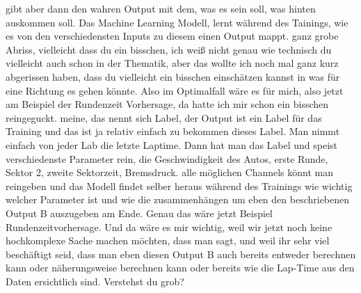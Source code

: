 gibt aber dann  den wahren Output mit dem, was es sein soll, was hinten auskommen soll. Das Machine Learning Modell, lernt während des Tainings,  wie es von den verschiedensten Inputs zu diesem  einen  Output mappt. ganz grobe Abriss, vielleicht dass du ein bisschen, ich weiß nicht genau wie technisch du vielleicht  auch schon in der Thematik, aber das wollte ich noch mal ganz kurz abgerissen haben, dass du vielleicht ein bisschen einschätzen kannst in was für eine Richtung  es gehen könnte. Also im Optimalfall wäre es für mich, also jetzt am Beispiel der Rundenzeit Vorhersage, da hatte ich mir schon ein bisschen reingeguckt. meine, das nennt sich Label, der Output ist ein Label für das Training und das ist ja relativ einfach zu bekommen dieses Label. Man nimmt einfach von jeder Lab die letzte Laptime. Dann hat man das Label und speist verschiedenste Parameter rein, die Geschwindigkeit des Autos, erste Runde, Sektor 2, zweite Sektorzeit, Bremsdruck. alle möglichen Channels könnt man reingeben und das Modell findet selber heraus während des Trainings wie wichtig welcher Parameter ist und wie die zusammenhängen um eben den beschriebenen Output B auszugeben am Ende. Genau das wäre jetzt Beispiel Rundenzeitvorhersage. Und da wäre es mir wichtig, weil wir jetzt noch keine hochkomplexe Sache machen möchten, dass man sagt, und weil ihr  sehr viel beschäftigt seid, dass man eben diesen Output B auch bereits entweder berechnen kann oder näherungsweise berechnen kann oder bereits wie die Lap-Time aus den Daten ersichtlich sind.  Verstehst du grob? 

